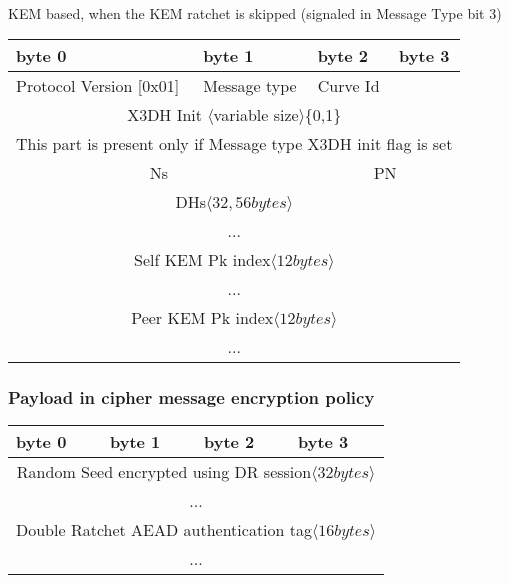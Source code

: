 \documentclass[a4paper,11pt]{article}
\begin{document}
      \paragraph*{}KEM based, when the KEM ratchet is skipped (signaled in Message Type bit 3)
      \begin{center}
      \begin{tabular}{ | p{1.4in} | p{1.4in} | p{1.4in} | p{1.4in} |}
        \hline
        \cellcolor[gray]{0.85} byte 0 & \cellcolor[gray]{0.85} byte 1 & \cellcolor[gray]{0.85} byte 2 & \cellcolor[gray]{0.85}byte 3\\
        \hline
        Protocol Version [0x01] & Message type & Curve Id & \\
        \cline{1-3}
        \multicolumn{4}{|c|}{X3DH Init $\langle $variable size$\rangle $\{0,1\}}\\
        \multicolumn{4}{|c|}{This part is present only if Message type X3DH init flag is set}\\
        \hline
        \multicolumn{2}{|c}{Ns}&\multicolumn{2}{|c|}{PN}\\
        \hline
        \multicolumn{4}{|c|}{DHs$\langle 32,56 bytes\rangle $}\\
        \multicolumn{4}{|c|}{...}\\
        \hline
        \multicolumn{4}{|c|}{Self KEM Pk index$\langle 12 bytes\rangle $}\\
        \multicolumn{4}{|c|}{...}\\
        \hline
        \multicolumn{4}{|c|}{Peer KEM Pk index$\langle 12 bytes\rangle $}\\
        \multicolumn{4}{|c|}{...}\\
        \hline

      \end{tabular}
      \end{center}

      \subsubsection{Payload in cipher message encryption policy}
      \begin{center}
      \begin{tabular}{ | p{1.4in} | p{1.4in} | p{1.4in} | p{1.4in} |}
        \hline
        \cellcolor[gray]{0.85} byte 0 & \cellcolor[gray]{0.85} byte 1 & \cellcolor[gray]{0.85} byte 2 & \cellcolor[gray]{0.85}byte 3\\
        \hline
        \multicolumn{4}{|c|}{Random Seed encrypted using DR session$\langle 32bytes\rangle $}\\
        \multicolumn{4}{|c|}{...}\\
        \hline
        \multicolumn{4}{|c|}{Double Ratchet AEAD authentication tag$\langle 16bytes\rangle $}\\
        \multicolumn{4}{|c|}{...}\\
        \hline
      \end{tabular}
      \end{center}
\end{document}
